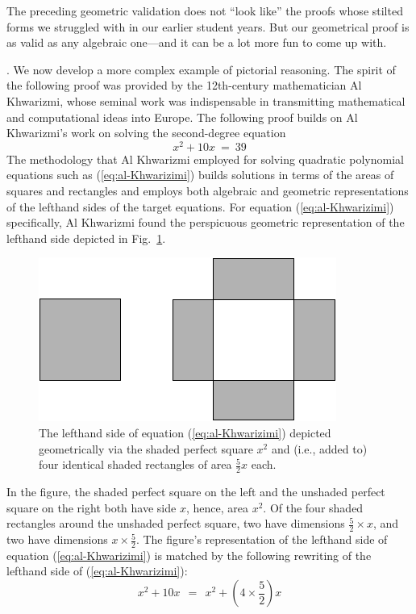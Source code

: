 \medskip

\noindent
The preceding geometric validation does not ``look like'' the proofs whose stilted forms we struggled with in our earlier student years.  But our geometrical proof is as valid as any algebraic one---and it can be a lot more fun to come up with.

\bigskip


.
We now develop a more complex example of pictorial reasoning.  The spirit of the following proof was provided by the 12th-century mathematician Al Khwarizmi, whose seminal work \cite{Al-Khwarizmi} was indispensable in transmitting mathematical and computational ideas into Europe.  The following proof builds on Al Khwarizmi's work on solving the second-degree equation
\begin{equation}
\label{eq:al-Khwarizimi}
x^2 + 10 x \ = \ 39
\end{equation}
The methodology that Al Khwarizmi employed for solving quadratic polynomial equations such as (\ref{eq:al-Khwarizimi}) builds solutions in terms of the areas of squares and rectangles and employs both algebraic and geometric representations of the lefthand sides of the target equations.  For equation (\ref{eq:al-Khwarizimi}) specifically, Al Khwarizmi found the perspicuous geometric representation of the lefthand side depicted in Fig.~\ref{fig:EqElKwarismi1}.
\begin{figure}[ht]
\begin{center}
       \includegraphics[scale=0.4]{FiguresArithmetic/EquationElKwarismi1}
\caption{The lefthand side of equation (\ref{eq:al-Khwarizimi})
  depicted geometrically via the shaded perfect square $x^2$ and (i.e., added
  to) four identical shaded rectangles of area $\frac{5}{2} x$ each.}
       \label{fig:EqElKwarismi1}
\end{center}
\end{figure}
In the figure, the shaded perfect square on the left and the unshaded perfect square on the right both have side $x$, hence, area $x^2$.  Of the four shaded rectangles around the unshaded perfect square, two have dimensions $\frac{5}{2} \times x$, and two have dimensions $x \times \frac{5}{2}$.  The figure's representation of the lefthand side of equation (\ref{eq:al-Khwarizimi}) is matched by the following rewriting of the lefthand side of (\ref{eq:al-Khwarizimi}):
\[ x^2 + 10 x \ \ = \ \ x^2 + \left( 4 \times \frac{5}{2} \right) x \]

